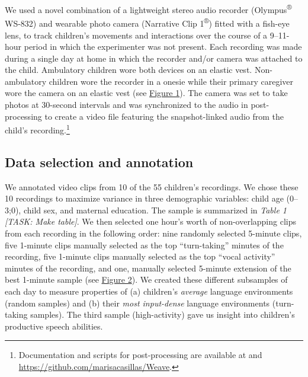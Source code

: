 \documentclass[floatsintext,man]{apa6}
\theoremstyle{definition}
\theoremstyle{definition}
\theoremstyle{definition}
\theoremstyle{remark}
\begin{document}
We used a novel combination of a lightweight stereo audio recorder
(Olympus\textsuperscript{®} WS-832) and wearable photo camera (Narrative
Clip 1\textsuperscript{®}) fitted with a fish-eye lens, to track
children's movements and interactions over the course of a 9--11-hour
period in which the experimenter was not present. Each recording was
made during a single day at home in which the recorder and/or camera was
attached to the child. Ambulatory children wore both devices on an
elastic vest. Non-ambulatory children wore the recorder in a onesie
while their primary caregiver wore the camera on an elastic vest (see
\protect\hyperlink{fig1}{Figure 1}). The camera was set to take photos
at 30-second intervals and was synchronized to the audio in
post-processing to create a video file featuring the snapshot-linked
audio from the child's recording.\footnote{Documentation and scripts for
  post-processing are available at and
  \url{https://github.com/marisacasillas/Weave}.}

\subsection{Data selection and annotation}\label{methods-samples}

We annotated video clips from 10 of the 55 children's recordings. We
chose these 10 recordings to maximize variance in three demographic
variables: child age (0--3;0), child sex, and maternal education. The
sample is summarized in \emph{Table 1} \emph{{[}TASK: Make table{]}}. We
then selected one hour's worth of non-overlapping clips from each
recording in the following order: nine randomly selected 5-minute clips,
five 1-minute clips manually selected as the top \enquote{turn-taking}
minutes of the recording, five 1-minute clips manually selected as the
top \enquote{vocal activity} minutes of the recording, and one, manually
selected 5-minute extension of the best 1-minute sample (see
\protect\hyperlink{fig2}{Figure 2}). We created these different
subsamples of each day to measure properties of (a) children's
\emph{average} language environments (random samples) and (b) their
\emph{most input-dense} language environments (turn-taking samples). The
third sample (high-activity) gave us insight into children's productive
speech abilities.
\end{document}
